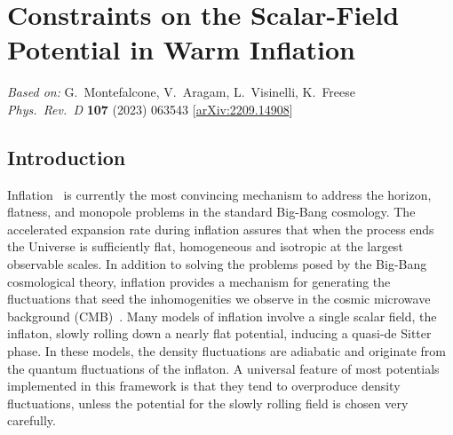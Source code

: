 \chapter{Constraints on the Scalar-Field Potential in Warm Inflation}
\label{ch:wi-scalar-field}

\begin{center}
\textit{Based on:} G.~Montefalcone, V.~Aragam, L.~Visinelli, K.~Freese\\
\textit{Phys.\ Rev.\ D} \textbf{107} (2023) 063543
[\href{https://arxiv.org/abs/2209.14908}{arXiv:2209.14908}]
\end{center}
\vspace{1em}


\section{Introduction}
\label{sec:ch2-intro}

Inflation~\citep{Guth:1980zm,Linde:1981mu, Albrecht:1982wi,Kazanas:1980tx, Starobinsky:1980te, Sato:1981ds, Sato:1980yn, Mukhanov:1981xt, Linde:1983gd,Mukhanov:2003xw} is currently the most convincing mechanism to address the horizon, flatness, and monopole problems in the standard Big-Bang cosmology. The accelerated expansion rate during inflation assures that when the process ends the Universe is sufficiently flat, homogeneous and isotropic at the largest observable scales. In addition to solving the problems posed by the Big-Bang cosmological theory, inflation provides a mechanism for generating the fluctuations that seed the inhomogenities we observe in the cosmic microwave background (CMB)~\citep{Planck:2018nkj}. Many models of inflation involve a single scalar field, the inflaton, slowly rolling down a nearly flat potential, inducing a quasi-de Sitter phase. In these models, the density fluctuations are adiabatic and originate from the quantum fluctuations of the inflaton. A universal feature of most potentials implemented in this framework is that they tend to overproduce density fluctuations, unless the potential for the slowly rolling field is chosen very carefully.

